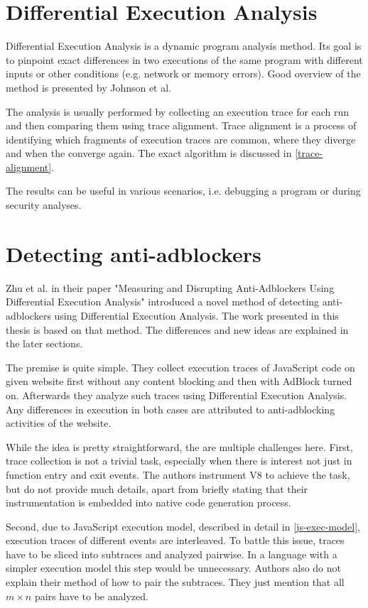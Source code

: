 \section{Differential Execution Analysis}
Differential Execution Analysis is a dynamic program analysis method. Its goal is to pinpoint exact differences
in two executions of the same program with different inputs or other conditions (e.g. network or memory errors).
Good overview of the method is presented by Johnson et al. \cite{ieee:alignment-and-slicing}

The analysis is usually performed by collecting an execution trace for each run and then comparing
them using trace alignment. Trace alignment is a process of identifying which fragments of execution traces
are common, where they diverge and when the converge again. The exact algorithm is discussed in \ref{trace-alignment}.

The results can be useful in various scenarios, i.e. debugging a program or during security analyses.


\section{Detecting anti-adblockers}
Zhu et al. in their paper "Measuring and Disrupting Anti-Adblockers Using Differential Execution Analysis" 
 \cite{DBLP:conf/ndss/ZhuHQSY18} introduced a novel method of detecting anti-adblockers
using Differential Execution Analysis. The work presented in this thesis is based on that method. 
The differences and new ideas are explained in the later sections.

The premise is quite simple. They collect execution traces of JavaScript code on given website
first without any content blocking and then with AdBlock turned on.
Afterwards they analyze such traces using Differential Execution Analysis. Any differences in execution in both cases
are attributed to anti-adblocking activities of the website.

While the idea is pretty straightforward, the are multiple challenges here. 
First, trace collection is not a trivial task, especially when there is interest not just in function entry and exit events.
The authors instrument V8 to achieve the task, but do not provide much details, apart from briefly stating that
their instrumentation is embedded into native code generation process.

Second, due to JavaScript execution model, described in detail in \ref{js-exec-model}, execution traces of different
events are interleaved. To battle this issue, traces have to be sliced into subtraces and analyzed pairwise.
In a language with a simpler execution model this step would be unnecessary.
Authors also do not explain their method of how to pair the subtraces. They just mention that all $m \times n$ pairs 
have to be analyzed.

